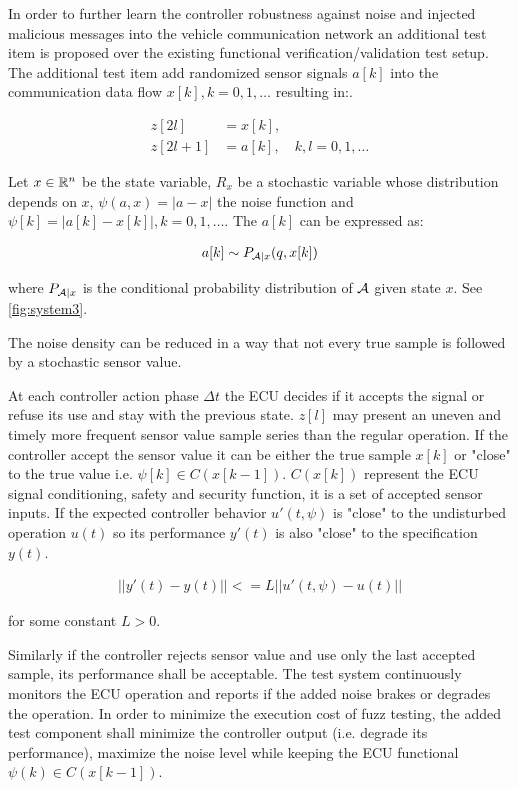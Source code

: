 \documentclass[a4paper, fleqn]{cas-dc}
\begin{document}
	In order to further learn the controller robustness against noise and injected malicious messages into the vehicle communication network an additional test item is proposed over the existing functional verification/validation test setup. The additional test item add randomized sensor signals $a[k]$ into the communication data flow $x[k], k=0, 1, \ldots$ resulting in:.
	
	\begin{equation}
		\begin{aligned}
			z[2l] &= x[k], \\
			z[2l+1] &= a[k], \quad k, l = 0, 1, \dots
		\end{aligned}
	\end{equation}
	
	
	Let $x\in\mathbb R^n$ be the state variable, $R_x$ be a stochastic variable whose distribution depends on 
	$x$, $\psi(a, x) = |a-x|$ the noise function and $\psi[k] = |a[k] - x[k]|, k=0,1,\ldots$. The $a[k]$ can be expressed as:
	
	\begin{align}
		a[k] \sim P_{\mathcal{A}|x}(q, x[k])
	\end{align}
	
	where $P_{\mathcal{A}|x}$ is the conditional probability distribution of $\mathcal{A}$ given state $x$. See \autoref{fig:system3}.
	
	The noise density can be reduced in a way that not every true sample is followed by a stochastic sensor value.
	
	At each controller action phase $\Delta t$ the ECU decides if it accepts the signal or refuse its use and stay with the previous state. $z[l]$ may present an uneven and timely more frequent sensor value sample series than the regular operation. If the controller accept the sensor value it can be either the true sample $x[k]$ or "close" to the true value i.e. $\psi[k] \in C(x[k-1])$. $C(x[k])$ represent the ECU signal conditioning, safety and security function, it is a set of accepted sensor inputs. If the expected controller behavior $u'(t, \psi)$ is "close" to the undisturbed operation $u(t)$ so its performance $y'(t)$ is also "close" to the specification $y(t)$. 
	
	\begin{align}
		||y'(t) - y(t)|| <= L||u'(t, \psi) - u(t)||
	\end{align}
	
	for some constant $L>0$.
	
	Similarly if the controller rejects sensor value and use only the last accepted sample, its performance shall be acceptable.
	The test system continuously monitors the ECU operation and reports if the added noise brakes or degrades the operation. 
	In order to minimize the execution cost of fuzz testing, the added test component shall minimize the controller output (i.e. degrade its performance), maximize the noise level while keeping the ECU functional $\psi(k) \in C(x[k-1])$.
	
\end{document}
